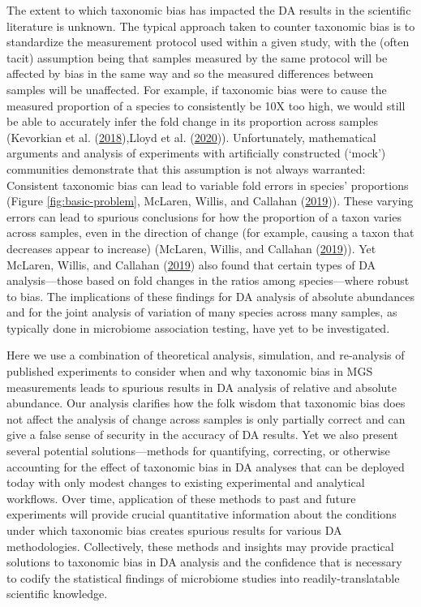 \documentclass[
]{article}
\begin{document}
The extent to which taxonomic bias has impacted the DA results in the scientific literature is unknown.
The typical approach taken to counter taxonomic bias is to standardize the measurement protocol used within a given study, with the (often tacit) assumption being that samples measured by the same protocol will be affected by bias in the same way and so the measured differences between samples will be unaffected.
For example, if taxonomic bias were to cause the measured proportion of a species to consistently be 10X too high, we would still be able to accurately infer the fold change in its proportion across samples (Kevorkian et al. (\protect\hyperlink{ref-kevorkian2018esti}{2018}),Lloyd et al. (\protect\hyperlink{ref-lloyd2020evid}{2020})).
Unfortunately, mathematical arguments and analysis of experiments with artificially constructed (`mock') communities demonstrate that this assumption is not always warranted:
Consistent taxonomic bias can lead to variable fold errors in species' proportions (Figure \ref{fig:basic-problem}, McLaren, Willis, and Callahan (\protect\hyperlink{ref-mclaren2019cons}{2019})).
These varying errors can lead to spurious conclusions for how the proportion of a taxon varies across samples, even in the direction of change (for example, causing a taxon that decreases appear to increase) (McLaren, Willis, and Callahan (\protect\hyperlink{ref-mclaren2019cons}{2019})).
Yet McLaren, Willis, and Callahan (\protect\hyperlink{ref-mclaren2019cons}{2019}) also found that certain types of DA analysis---those based on fold changes in the ratios among species---where robust to bias.
The implications of these findings for DA analysis of absolute abundances and for the joint analysis of variation of many species across many samples, as typically done in microbiome association testing, have yet to be investigated.

Here we use a combination of theoretical analysis, simulation, and re-analysis of published experiments to consider when and why taxonomic bias in MGS measurements leads to spurious results in DA analysis of relative and absolute abundance.
Our analysis clarifies how the folk wisdom that taxonomic bias does not affect the analysis of change across samples is only partially correct and can give a false sense of security in the accuracy of DA results.
Yet we also present several potential solutions---methods for quantifying, correcting, or otherwise accounting for the effect of taxonomic bias in DA analyses that can be deployed today with only modest changes to existing experimental and analytical workflows.
Over time, application of these methods to past and future experiments will provide crucial quantitative information about the conditions under which taxonomic bias creates spurious results for various DA methodologies.
Collectively, these methods and insights may provide practical solutions to taxonomic bias in DA analysis and the confidence that is necessary to codify the statistical findings of microbiome studies into readily-translatable scientific knowledge.
\end{document}
